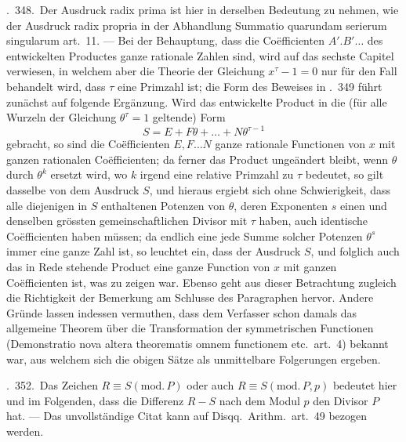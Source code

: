 \textsection.\ 348.\ Der Ausdruck radix prima ist hier in derselben Bedeutung zu nehmen, wie der Ausdruck radix propria in der Abhandlung Summatio quarundam serierum singularum art.\ 11. --- Bei der Behauptung, dass die Coëfficienten $A'.B'\ldots$ des entwickelten Productes ganze rationale Zahlen sind, wird auf das sechste Capitel verwiesen, in welchem aber die Theorie der Gleichung $x^\tau-1=0$ nur für den Fall behandelt wird, dass $\tau$ eine Primzahl ist; die Form des Beweises in \textsection.\ 349 führt zunächst auf folgende Ergänzung. Wird das entwickelte Product in die (für alle Wurzeln der Gleichung $\theta^\tau=1$ geltende) Form
\[
S=E+F\theta+\ldots+N\theta^{\tau-1}
\]
gebracht, so sind die Coëfficienten $E,F\ldots N$ ganze rationale Functionen von $x$ mit ganzen rationalen Coëfficienten; da ferner das Product ungeändert bleibt, wenn $\theta$ durch $\theta^k$ ersetzt wird, wo $k$ irgend eine relative Primzahl zu $\tau$ bedeutet, so gilt dasselbe von dem Ausdruck $S$, und hieraus ergiebt sich ohne Schwierigkeit, dass alle diejenigen in $S$ enthaltenen Potenzen von $\theta$, deren Exponenten $s$ einen und denselben grössten gemeinschaftlichen Divisor mit $\tau$ haben, auch identische Coëfficienten haben müssen; da endlich eine jede Summe solcher Potenzen $\theta^s$ immer eine ganze Zahl ist, so leuchtet ein, dass der Ausdruck $S$, und folglich auch das in Rede stehende Product eine ganze Function von $x$ mit ganzen Coëfficienten ist, was zu zeigen war. Ebenso geht aus dieser Betrachtung zugleich die Richtigkeit der Bemerkung am Schlusse des Paragraphen hervor. Andere Gründe lassen indessen vermuthen, dass dem Verfasser schon damals das allgemeine Theorem über die Transformation der symmetrischen Functionen (Demonstratio nova altera theorematis omnem functionem etc.\ art.\ 4) bekannt war, aus welchem sich die obigen Sätze als unmittelbare Folgerungen ergeben.

\textsection.\ 352.\ Das Zeichen $R\equiv S(\mathrm{mod.}\,P)$ oder auch $R\equiv S(\mathrm{mod.}\,P,p)$ bedeutet hier und im 
%
Folgenden, dass die Differenz $R-S$ nach dem Modul $p$ den Divisor $P$ hat. --- Das unvollständige Citat kann auf Disqq.\ Arithm.\ art.\ 49 bezogen werden.

